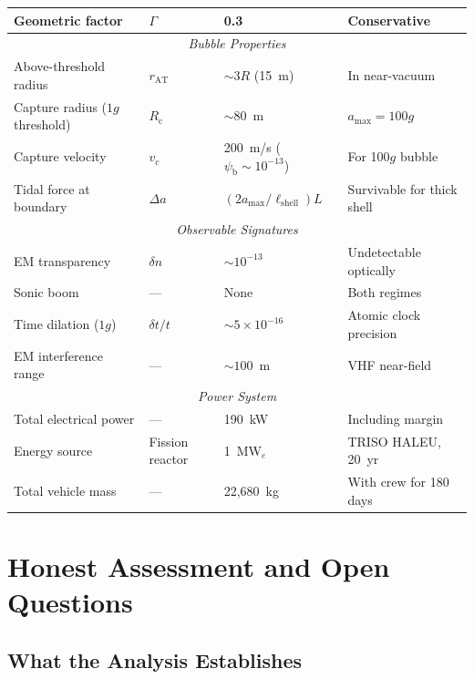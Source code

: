 \documentclass[12pt,aps,prd,superscriptaddress,nofootinbib,longbibliography]{revtex4-2}
\newcommand{\psib}{\psi_{\mathrm{b}}}
\newcommand{\Rc}{R_{\mathrm{c}}}
\newcommand{\Lshell}{\ell_{\mathrm{shell}}}
\begin{document}
\begin{table}[t]
\begin{ruledtabular}
\begin{tabular}{llll}
Geometric factor & $\Gamma$ & 0.3 & Conservative \\
\hline
\multicolumn{4}{c}{\textit{Bubble Properties}} \\
Above-threshold radius & $r_{\mathrm{AT}}$ & $\sim 3R$ (15~m) & In near-vacuum \\
Capture radius ($1g$ threshold) & $\Rc$ & $\sim 80$~m & $a_{\mathrm{max}} = 100g$ \\
Capture velocity & $v_c$ & 200~m/s ($\psib \sim 10^{-13}$) & For 100$g$ bubble \\
Tidal force at boundary & $\Delta a$ & $(2a_{\mathrm{max}}/\Lshell) L$ &
  Survivable for thick shell \\
\hline
\multicolumn{4}{c}{\textit{Observable Signatures}} \\
EM transparency & $\delta n$ & $\sim 10^{-13}$ & Undetectable optically \\
Sonic boom & --- & None & Both regimes \\
Time dilation ($1g$) & $\delta t/t$ & $\sim 5 \times 10^{-16}$ & Atomic clock precision \\
EM interference range & --- & $\sim 100$~m & VHF near-field \\
\hline
\multicolumn{4}{c}{\textit{Power System}} \\
Total electrical power & --- & 190~kW & Including margin \\
Energy source & Fission reactor & 1~MW$_e$ & TRISO HALEU, 20~yr \\
Total vehicle mass & --- & 22,680~kg & With crew for 180 days \\
\end{tabular}
\end{ruledtabular}
\end{table}


\section{Honest Assessment and Open Questions}\label{sec:assessment}

\subsection{What the Analysis Establishes}
\end{document}
